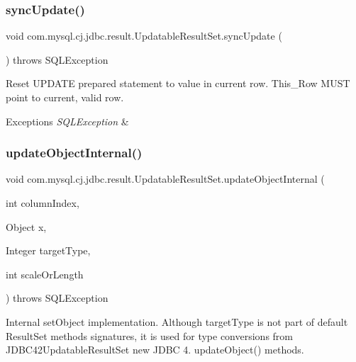 \subsubsection{\texorpdfstring{sync\+Update()}{syncUpdate()}}
{\footnotesize\ttfamily void com.\+mysql.\+cj.\+jdbc.\+result.\+Updatable\+Result\+Set.\+sync\+Update (\begin{DoxyParamCaption}{ }\end{DoxyParamCaption}) throws S\+Q\+L\+Exception\hspace{0.3cm}{\ttfamily [protected]}}

Reset U\+P\+D\+A\+TE prepared statement to value in current row. This\+\_\+\+Row M\+U\+ST point to current, valid row.


\begin{DoxyExceptions}{Exceptions}
{\em S\+Q\+L\+Exception} & \\
\hline
\end{DoxyExceptions}
\mbox{\label{classcom_1_1mysql_1_1cj_1_1jdbc_1_1result_1_1_updatable_result_set_a65af746cb788d9ddadcf675f0b96023b}} 
\subsubsection{\texorpdfstring{update\+Object\+Internal()}{updateObjectInternal()}\hspace{0.1cm}{\footnotesize\ttfamily [1/2]}}
{\footnotesize\ttfamily void com.\+mysql.\+cj.\+jdbc.\+result.\+Updatable\+Result\+Set.\+update\+Object\+Internal (\begin{DoxyParamCaption}\item[{int}]{column\+Index,  }\item[{Object}]{x,  }\item[{Integer}]{target\+Type,  }\item[{int}]{scale\+Or\+Length }\end{DoxyParamCaption}) throws S\+Q\+L\+Exception\hspace{0.3cm}{\ttfamily [protected]}}

Internal set\+Object implementation. Although target\+Type is not part of default Result\+Set methods signatures, it is used for type conversions from J\+D\+B\+C42\+Updatable\+Result\+Set new J\+D\+BC 4. update\+Object() methods.


